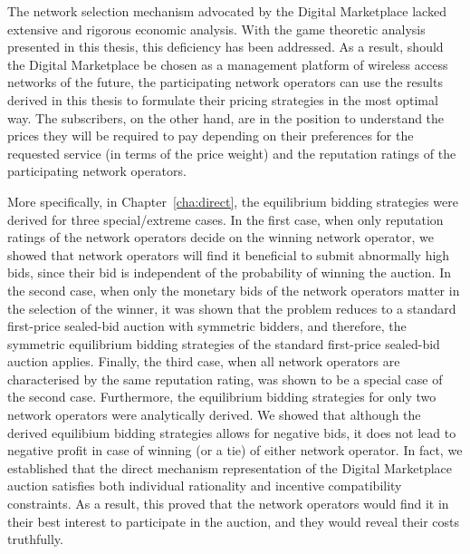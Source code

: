 The network selection mechanism advocated by the Digital Marketplace lacked extensive and rigorous economic analysis. With the game theoretic analysis presented in this thesis, this deficiency has been addressed. As a result, should the Digital Marketplace be chosen as a management platform of wireless access networks of the future, the participating network operators can use the results derived in this thesis to formulate their pricing strategies in the most optimal way. The subscribers, on the other hand, are in the position to understand the prices they will be required to pay depending on their preferences for the requested service (in terms of the price weight) and the reputation ratings of the participating network operators.

More specifically, in Chapter~\ref{cha:direct}, the equilibrium bidding strategies were derived for three special/extreme cases. In the first case, when only reputation ratings of the network operators decide on the winning network operator, we showed that network operators will find it beneficial to submit abnormally high bids, since their bid is independent of the probability of winning the auction. In the second case, when only the monetary bids of the network operators matter in the selection of the winner, it was shown that the problem reduces to a standard first-price sealed-bid auction with symmetric bidders, and therefore, the symmetric equilibrium bidding strategies of the standard first-price sealed-bid auction applies. Finally, the third case, when all network operators are characterised by the same reputation rating, was shown to be a special case of the second case. Furthermore, the equilibrium bidding strategies for only two network operators were analytically derived. We showed that although the derived equilibium bidding strategies allows for negative bids, it does not lead to negative profit in case of winning (or a tie) of either network operator. In fact, we established that the direct mechanism representation of the Digital Marketplace auction satisfies both individual rationality and incentive compatibility constraints. As a result, this proved that the network operators would find it in their best interest to participate in the auction, and they would reveal their costs truthfully.


